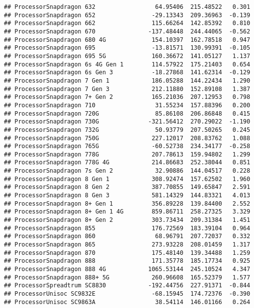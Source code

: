 \documentclass[
]{article}
\begin{document}
\begin{verbatim}
## ProcessorSnapdragon 632                 64.95406  215.48522   0.301
## ProcessorSnapdragon 652                -29.13343  209.36963  -0.139
## ProcessorSnapdragon 662                115.66264  142.85392   0.810
## ProcessorSnapdragon 670               -137.48448  244.44065  -0.562
## ProcessorSnapdragon 680 4G             154.10397  162.78518   0.947
## ProcessorSnapdragon 695                -13.81571  130.99391  -0.105
## ProcessorSnapdragon 695 5G             160.36672  141.05127   1.137
## ProcessorSnapdragon 6s 4G Gen 1        114.57922  175.21403   0.654
## ProcessorSnapdragon 6s Gen 3           -18.27868  141.62314  -0.129
## ProcessorSnapdragon 7 Gen 1            186.05288  144.22434   1.290
## ProcessorSnapdragon 7 Gen 3            212.11880  152.89108   1.387
## ProcessorSnapdragon 7+ Gen 2           165.21036  207.12953   0.798
## ProcessorSnapdragon 710                 31.55234  157.88396   0.200
## ProcessorSnapdragon 720G                85.86108  206.86848   0.415
## ProcessorSnapdragon 730G              -321.56412  270.29022  -1.190
## ProcessorSnapdragon 732G                50.93779  207.50265   0.245
## ProcessorSnapdragon 750G               227.12017  208.83762   1.088
## ProcessorSnapdragon 765G               -60.52738  234.34177  -0.258
## ProcessorSnapdragon 778G               207.78613  159.94802   1.299
## ProcessorSnapdragon 778G 4G            214.86683  252.38044   0.851
## ProcessorSnapdragon 7s Gen 2            32.90886  144.04517   0.228
## ProcessorSnapdragon 8 Gen 1            308.92474  157.62502   1.960
## ProcessorSnapdragon 8 Gen 2            387.70855  149.65847   2.591
## ProcessorSnapdragon 8 Gen 3            581.14329  144.83321   4.013
## ProcessorSnapdragon 8+ Gen 1           356.89228  139.84400   2.552
## ProcessorSnapdragon 8+ Gen 1 4G        859.86711  258.27325   3.329
## ProcessorSnapdragon 8+ Gen 2           303.73434  209.31384   1.451
## ProcessorSnapdragon 855                176.72569  183.39104   0.964
## ProcessorSnapdragon 860                 68.96791  207.72037   0.332
## ProcessorSnapdragon 865                273.93228  208.01459   1.317
## ProcessorSnapdragon 870                175.48140  139.34488   1.259
## ProcessorSnapdragon 888                171.35778  185.17734   0.925
## ProcessorSnapdragon 888 4G            1065.53144  245.10524   4.347
## ProcessorSnapdragon 888+ 5G            260.96608  165.52379   1.577
## ProcessorSpreadtrum SC8830            -192.44756  227.91371  -0.844
## ProcessorUnisoc SC9832E                -68.15945  174.72376  -0.390
## ProcessorUnisoc SC9863A                 38.54114  146.01166   0.264

\end{verbatim}
\end{document}
